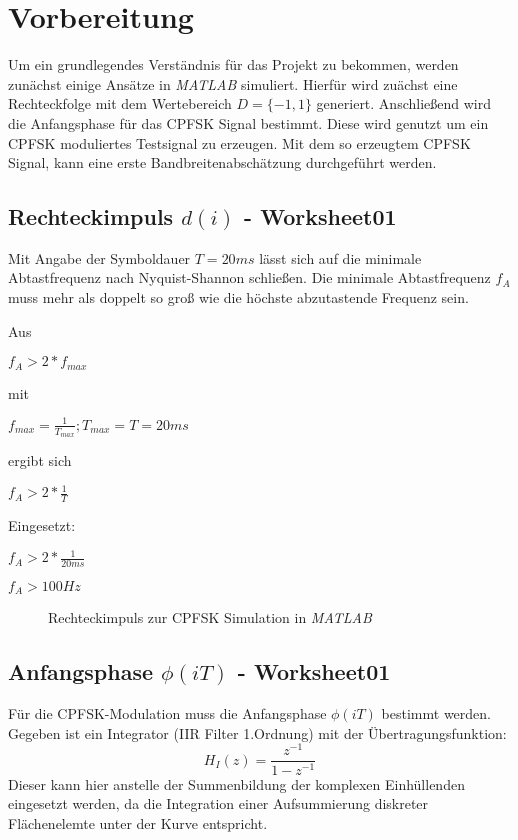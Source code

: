 \documentclass{article}
\begin{document}
\section{Vorbereitung}
Um ein grundlegendes Verständnis für das Projekt zu bekommen, werden zunächst einige Ansätze in \textit{MATLAB} simuliert.
Hierfür wird zuächst eine Rechteckfolge mit dem Wertebereich $D = \{-1,1\}$ generiert. Anschließend wird die Anfangsphase für das CPFSK Signal bestimmt. Diese wird genutzt um ein 
\ac{CPFSK} moduliertes Testsignal zu erzeugen. Mit dem so erzeugtem CPFSK Signal, kann eine erste Bandbreitenabschätzung durchgeführt werden.


\subsection{Rechteckimpuls $d(i)$ - Worksheet01}\label{sec:rechteck}
Mit Angabe der Symboldauer $T = 20ms$ lässt sich auf die minimale Abtastfrequenz nach Nyquist-Shannon schließen.
Die minimale Abtastfrequenz $f_A$ muss mehr als doppelt so groß wie die höchste abzutastende Frequenz sein.

Aus
\begin{center}
 $
f_A > 2*f_{max}
$
\end{center}

mit 
\begin{center} $f_{max} = \frac{1}{T_{max}} ; T_{max} = T = 20ms$  \end{center}

ergibt sich

\begin{center}
$
f_A > 2*\frac{1}{T}
$
\end{center}

Eingesetzt:
\begin{center}
$f_A > 2*\frac{1}{20ms}$
\end{center}
\begin{center}
$f_A > 100Hz$   
\end{center}
\begin{figure}[!h]
    \centering
    \def\svgscale{0.3}
    \def\svgwidth{\columnwidth}
    \caption{Rechteckimpuls zur \ac{CPFSK} Simulation in \textit{MATLAB}}
\end{figure}

\subsection{Anfangsphase $\phi(iT)$ - Worksheet01}
Für die \ac{CPFSK}-Modulation muss die Anfangsphase $\phi(iT)$ bestimmt werden.
Gegeben ist ein Integrator (IIR Filter 1.Ordnung) mit der Übertragungsfunktion:
$$
H_I(z)=\frac{z^{-1}}{1-z^{-1}}
$$
Dieser kann hier anstelle der Summenbildung der komplexen Einhüllenden eingesetzt werden, 
da die Integration einer Aufsummierung diskreter Flächenelemte unter der Kurve entspricht.
\end{document}
